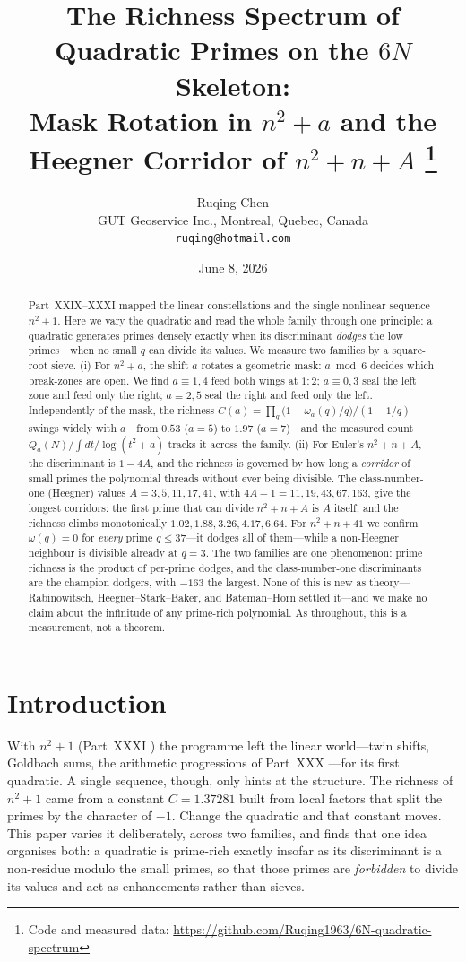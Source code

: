 \documentclass[11pt]{article}
\title{\bf The Richness Spectrum of Quadratic Primes on the $6N$ Skeleton:\\
Mask Rotation in $n^2+a$ and the Heegner Corridor of $n^2+n+A$%
\thanks{Code and measured data: \url{https://github.com/Ruqing1963/6N-quadratic-spectrum}}}
\author{Ruqing Chen\\
\small GUT Geoservice Inc., Montreal, Quebec, Canada\\
\small \texttt{ruqing@hotmail.com}}
\date{June 8, 2026}
\theoremstyle{definition}
\begin{document}
\maketitle

\begin{abstract}
Part~XXIX--XXXI mapped the linear constellations and the single nonlinear sequence $n^2+1$. Here we
vary the quadratic and read the whole family through one principle: a quadratic generates primes
densely exactly when its discriminant \emph{dodges} the low primes---when no small $q$ can divide its
values. We measure two families by a square-root sieve. (i) For $n^2+a$, the shift $a$ rotates a
geometric mask: $a\bmod6$ decides which break-zones are open. We find $a\equiv1,4$ feed both wings at
$1{:}2$; $a\equiv0,3$ seal the left zone and feed only the right; $a\equiv2,5$ seal the right and feed
only the left. Independently of the mask, the richness
$C(a)=\prod_q\bigl(1-\omega_a(q)/q\bigr)/(1-1/q)$ swings widely with $a$---from $0.53$ ($a=5$) to
$1.97$ ($a=7$)---and the measured count $Q_a(N)/\!\int dt/\log(t^2{+}a)$ tracks it across the family.
(ii) For Euler's $n^2+n+A$, the discriminant is $1-4A$, and the richness is governed by how long a
\emph{corridor} of small primes the polynomial threads without ever being divisible. The
class-number-one (Heegner) values $A=3,5,11,17,41$, with $4A-1=11,19,43,67,163$, give the longest
corridors: the first prime that can divide $n^2+n+A$ is $A$ itself, and the richness climbs
monotonically $1.02,1.88,3.26,4.17,6.64$. For $n^2+n+41$ we confirm $\omega(q)=0$ for \emph{every}
prime $q\le37$---it dodges all of them---while a non-Heegner neighbour is divisible already at $q=3$.
The two families are one phenomenon: prime richness is the product of per-prime dodges, and the
class-number-one discriminants are the champion dodgers, with $-163$ the largest. None of this is new
as theory---Rabinowitsch, Heegner--Stark--Baker, and Bateman--Horn settled it---and we make no claim
about the infinitude of any prime-rich polynomial. As throughout, this is a measurement, not a theorem.
\end{abstract}

\section{Introduction}
With $n^2+1$ (Part~XXXI \cite{PXXXI}) the programme left the linear world---twin shifts, Goldbach
sums, the arithmetic progressions of Part~XXX \cite{PXXX}---for its first quadratic. A single sequence,
though, only hints at the structure. The richness of $n^2+1$ came from a constant $C=1.37281$ built
from local factors that split the primes by the character of $-1$. Change the quadratic and that
constant moves. This paper varies it deliberately, across two families, and finds that one idea
organises both: a quadratic is prime-rich exactly insofar as its discriminant is a non-residue modulo
the small primes, so that those primes are \emph{forbidden} to divide its values and act as
enhancements rather than sieves.
\end{document}
